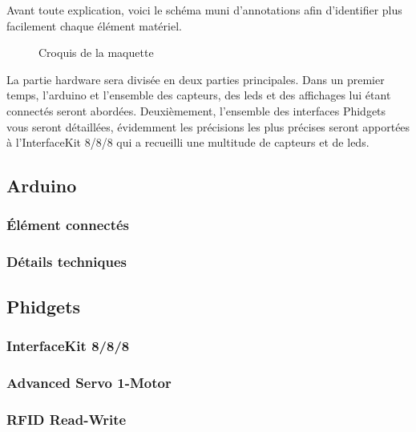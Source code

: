 Avant toute explication, voici le schéma muni d’annotations afin d’identifier plus facilement chaque élément matériel.\\

\begin{figure}[H]
    \begin{center}

        \caption{Croquis de la maquette}
    \end{center}
\end{figure}

La partie hardware sera divisée en deux parties principales. Dans un premier temps, l’arduino et l’ensemble des capteurs, des leds et des affichages lui étant connectés seront abordées. Deuxièmement, l’ensemble des interfaces Phidgets vous seront détaillées, évidemment les précisions les plus précises seront apportées à l’InterfaceKit 8/8/8 qui a recueilli une multitude de capteurs et de leds.\\

\subsection{Arduino}
\subsubsection{Élément connectés}
\subsubsection{Détails techniques}

\subsection{Phidgets}
\subsubsection{InterfaceKit 8/8/8}
\subsubsection{Advanced Servo 1-Motor}
\subsubsection{RFID Read-Write}

